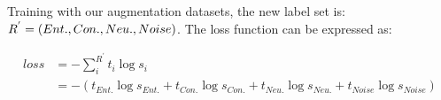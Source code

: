 Training with our augmentation datasets, the new label set is: 
$R^{'}=(Ent., Con., Neu.,\\ Noise)$.
The loss function can be expressed as:

\begin{equation}
\begin{aligned}
 loss &= -\sum_{i}^{R^{'}}t_{i}\log s_{i} \\
      &=-\left ( t_{Ent.}\log s_{Ent.} + t_{Con.}\log s_{Con.} +  t_{Neu.}\log s_{Neu.} +  t_{Noise}\log s_{Noise}\right )
\end{aligned}
\end{equation}

















